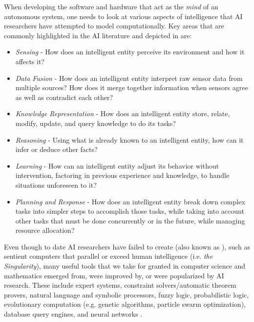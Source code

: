 When developing the software and hardware that act as the \textit{mind} of an autonomous system, one needs to look at various aspects of intelligence that AI researchers have attempted to model computationally. Key areas that are commonly highlighted in the AI literature and depicted in  are:
\begin{itemize}
\item \textit{Sensing} - How does an intelligent entity perceive its environment and how it affects it? 
\item \textit{Data Fusion} - How does an intelligent entity interpret raw sensor data from multiple sources? How does it merge together information when sensors agree as well as contradict each other?
\item \textit{Knowledge Representation} - How does an intelligent entity store, relate, modify, update, and query knowledge to do its tasks?
\item \textit{Reasoning} - Using what is already known to an intelligent entity, how can it infer or deduce other facts?
\item \textit{Learning} - How can an intelligent entity adjust its behavior without intervention, factoring in previous experience and knowledge, to handle situations unforeseen to it?
\item \textit{Planning and Response} - How does an intelligent entity break down complex tasks into simpler steps to accomplish those tasks, while taking into account other tasks that must be done concurrently or in the future, while managing resource allocation?
\end{itemize}
Even though to date AI researchers have failed to create  (also known as ), such as sentient computers that parallel or exceed human intelligence (i.e. \textit{the Singularity}), many useful tools that we take for granted in computer science and mathematics emerged from, were improved by, or were popularized by AI research. These include expert systems, constraint solvers/automatic theorem provers, natural language and symbolic processors, fuzzy logic, probabilistic logic, evolutionary computation (e.g. genetic algorithms, particle swarm optimization), database query engines, and neural networks \citep{russellnorvig:ai}.

